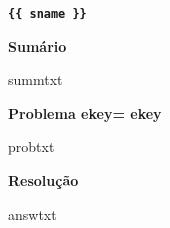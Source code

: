 \documentclass{article}
\begin{document}
{\centering\bf \verb"{{ sname }}" }

\noindent\textbf{Sumário}

{{ summtxt  }}

\noindent\textbf{Problema ekey={{ ekey }} }

{{ probtxt }} 

\noindent\textbf{Resolução}

{{ answtxt  }}
\end{document}
